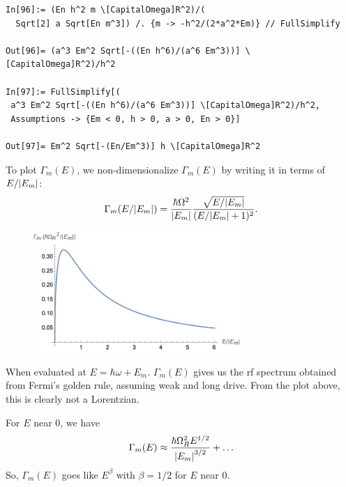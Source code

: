 \documentclass{article}
\theoremstyle{definition}
\newcommand{\be}{\beta}
\newcommand{\f}[2]{\frac{#1}{#2}}
\begin{document}
\begin{enumerate}[label=(\alph*)]
\begin{lstlisting}
In[96]:= (En h^2 m \[CapitalOmega]R^2)/(
  Sqrt[2] a Sqrt[En m^3]) /. {m -> -h^2/(2*a^2*Em)} // FullSimplify

Out[96]= (a^3 Em^2 Sqrt[-((En h^6)/(a^6 Em^3))] \[CapitalOmega]R^2)/h^2

In[97]:= FullSimplify[(
 a^3 Em^2 Sqrt[-((En h^6)/(a^6 Em^3))] \[CapitalOmega]R^2)/h^2, 
 Assumptions -> {Em < 0, h > 0, a > 0, En > 0}]

Out[97]= Em^2 Sqrt[-(En/Em^3)] h \[CapitalOmega]R^2
\end{lstlisting}


To plot $\Gamma_m(E)$, we non-dimensionalize $\Gamma_m(E)$ by writing it in terms of $E / \abs{E_m}$:
\begin{align*}
\Gamma_m(E/\abs{E_m}) = \f{\hbar \Omega^2}{\abs{E_m}} \f{\sqrt{E/\abs{E_m}  }}{  (E/\abs{E_m} + 1)^2}.
\end{align*}

\begin{figure}[!htb]
\centering
\includegraphics[width=0.7\textwidth]{gamma_m.png}
\end{figure}

When evaluated at $E = \hbar \omega + E_m$. $\Gamma_m(E)$ gives us the rf spectrum obtained from Fermi's golden rule, assuming weak and long drive. From the plot above, this is clearly not a Lorentzian. 

For $E$ near 0, we have
\begin{align*}
\Gamma_m(E) \approx \f{\hbar \Omega_R^2   E^{1/2}}{\abs{E_m}^{3/2}} + \dots 
\end{align*}
So, $\Gamma_m(E)$ goes like $E^{\be}$ with $\be = 1/2$ for $E$ near 0. 






\end{enumerate}
\end{document}
